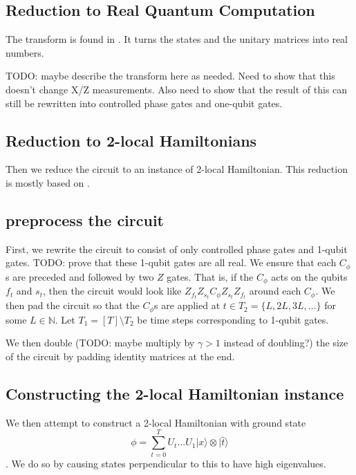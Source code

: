 \documentclass{article}
\theoremstyle{definition}
\begin{document}
\subsection{Reduction to Real Quantum Computation}

The transform is found in \cite{1109.0795}. It turns the states and the unitary matrices into real numbers.

TODO: maybe describe the transform here as needed. Need to show that this doesn't change X/Z measurements. Also need to show that the result of this can still be rewritten into controlled phase gates and one-qubit gates.

\subsection{Reduction to 2-local Hamiltonians}

Then we reduce the circuit to an instance of 2-local Hamiltonian. This reduction is mostly based on \cite{quant-ph/0406180}.

\subsection{preprocess the circuit}

First, we rewrite the circuit to consist of only controlled phase gates and 1-qubit gates. TODO: prove that these 1-qubit gates are all real. We ensure that each $C_\phi$s are preceded and followed by two $Z$ gates. That is, if the $C_\phi$ acts on the qubits $f_t$ and $s_t$, then the circuit would look like $Z_{f_t}Z_{s_t}C_\phi Z_{s_t}Z_{f_t}$ around each $C_\phi$. We then pad the circuit so that the $C_\phi$s are applied at $t\in T_2=\{L, 2L, 3L, \ldots\}$ for some $L\in\mathbb{N}$. Let $T_1=[T]\setminus T_2$ be time steps corresponding to 1-qubit gates.

We then double (TODO: maybe multiply by $\gamma>1$ instead of doubling?) the size of the circuit by padding identity matrices at the end.

\subsection{Constructing the 2-local Hamiltonian instance}

We then attempt to construct a 2-local Hamiltonian with ground state $$\phi=\sum_{t=0}^TU_t...U_1|x\rangle\otimes|\hat{t}\rangle$$. We do so by causing states perpendicular to this to have high eigenvalues.
\end{document}
